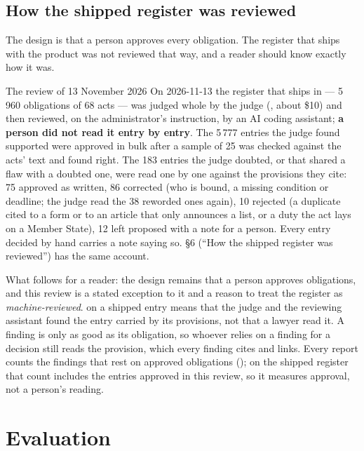 \subsection{How the shipped register was reviewed}\label{sec:control:shipped}

The design is that a person approves every obligation. The register that ships with the
product was not reviewed that way, and a reader should know exactly how it was.

\begin{notebox}{The review of 13 November 2026}
On 2026-11-13 the register that ships in  --- 5\,960
obligations of 68 acts --- was judged whole by the judge (,
about \$10) and then reviewed, on the administrator's instruction, by an AI coding assistant;
\textbf{a person did not read it entry by entry}. The 5\,777 entries the judge found
supported were approved in bulk after a sample of 25 was checked against the acts' text and
found right. The 183 entries the judge doubted, or that shared a flaw with a doubted one, were
read one by one against the provisions they cite: 75 approved as written, 86 corrected (who
is bound, a missing condition or deadline; the judge read the 38 reworded ones again), 10
rejected (a duplicate cited to a form or to an article that only announces a list, or a duty
the act lays on a Member State), 12 left proposed with a note for a person. Every entry decided by hand
carries a note saying so.  §6 (\enquote{How the shipped register was
reviewed}) has the same account.
\end{notebox}

What follows for a reader: the design remains that a person approves obligations, and this
review is a stated exception to it and a reason to treat the register as
\emph{machine-reviewed}.  on a shipped entry means that the judge and the
reviewing assistant found the entry carried by its provisions, not that a lawyer read it. A
finding is only as good as its obligation, so whoever relies on a finding for a decision
still reads the provision, which every finding cites and links. Every report counts the
findings that rest on approved obligations (); on the shipped
register that count includes the entries approved in this review, so it measures approval,
not a person's reading.


\section{Evaluation}\label{sec:control:eval}

